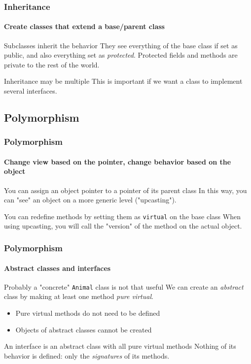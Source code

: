 \begin{frame}
\frametitle{Inheritance}
\framesubtitle{Create classes that extend a base/parent class}

\begin{block}{Subclasses inherit the behavior}
They see everything of the base class if set as public, and also everything set as {\em protected}. Protected fields and methods are private to the rest of the world.
\end{block}
\pause
\begin{block}{Inheritance may be multiple}
This is important if we want a class to implement several interfaces.
\end{block}

\end{frame}

\subsection{Polymorphism}

\begin{frame}
\frametitle{Polymorphism}
\framesubtitle{Change view based on the pointer, change behavior based on the object}

\begin{block}{You can assign an object pointer to a pointer of its parent class}
In this way, you can "see" an object on a more generic level ("upcasting").
\end{block}
\pause
\begin{block}{You can redefine methods by setting them as \texttt{virtual} on the base class}
When using upcasting, you will call the "version" of the method on the actual object.
\end{block}

\end{frame}

\begin{frame}
\frametitle{Polymorphism}
\framesubtitle{Abstract classes and interfaces}

\begin{block}{Probably a "concrete" \texttt{Animal} class is not that useful}
We can create an {\em abstract} class by making at least one method {\em pure virtual}.
\begin{itemize}
\item Pure virtual methods do not need to be defined
\item Objects of abstract classes cannot be created
\end{itemize}
\end{block}
\pause
\begin{block}{An interface is an abstract class with all pure virtual methods}
Nothing of its behavior is defined: only the {\em signatures} of its methods.
\end{block}

\end{frame}

